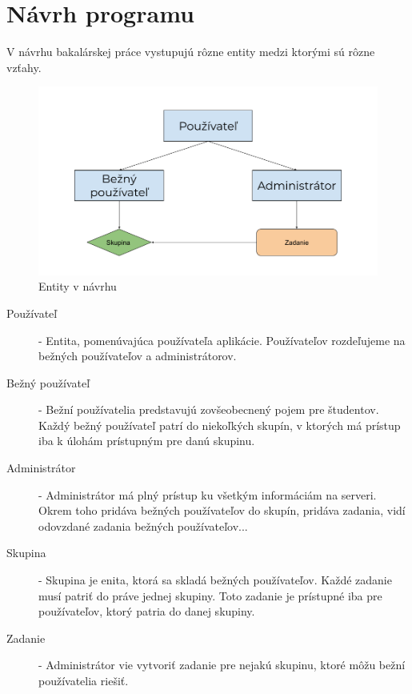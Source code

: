 \chapter{Návrh programu}

\label{kap:design} %

V návrhu bakalárskej práce vystupujú rôzne entity medzi ktorými sú rôzne vzťahy. 
\begin{figure}[H]
\centerline{\includegraphics[width=1\textwidth]{images/entity}}
\caption[Entity v návrhu]{Entity v návrhu}
\label{obr:entity}
\end{figure}

\begin{description}
\item [Používateľ] - Entita, pomenúvajúca používateľa aplikácie. Používateľov rozdeľujeme na 
bežných používateľov a administrátorov.
\item [Bežný používateľ] - Bežní používatelia predstavujú zovšeobecnený pojem pre študentov. Každý
bežný používateľ patrí do niekoľkých skupín, v ktorých má prístup iba k úlohám prístupným pre danú
skupinu.
\item [Administrátor] - Administrátor má plný prístup ku všetkým informáciám na serveri. Okrem
toho pridáva bežných používateľov do skupín, pridáva zadania, vidí odovzdané zadania bežných
používateľov...
\item [Skupina] - Skupina je enita, ktorá sa skladá bežných používateľov. Každé zadanie musí
patriť do práve jednej skupiny. Toto zadanie je prístupné iba pre používateľov, ktorý patria do
danej skupiny. 
\item [Zadanie] - Administrátor vie vytvoriť zadanie pre nejakú skupinu, ktoré môžu bežní
používatelia riešiť.  
\end{description}

